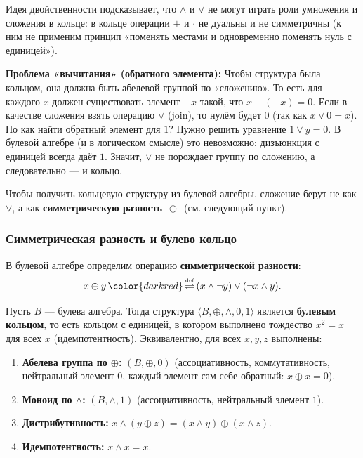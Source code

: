 \documentclass[11pt, a4paper]{extarticle}
\renewcommand{\eqdef}{\ifmmode{\,\color{darkred}\mathop{\overset{\text{\tiny def}}{\rightleftharpoons}}\,}\fi}%
\newcommand{\eqdef}{\,\mathop{\color{darkred}\overset{\text{\tiny def}}{\rightleftharpoons}}\,}
\begin{document}
\begin{remark}
Идея двойственности подсказывает, что $\wedge$ и $\vee$ не могут играть роли умножения и сложения в кольце:
в кольце операции $+$ и $\cdot$ не дуальны и не симметричны (к ним не применим принцип «поменять местами и одновременно поменять нуль с единицей»).

\medskip
\textbf{Проблема «вычитания» (обратного элемента):} Чтобы структура была кольцом, она должна быть абелевой группой по «сложению». То есть для каждого $x$ должен существовать элемент $-x$ такой, что $x + (-x) = 0$.
Если в качестве сложения взять операцию $\vee$ (join), то нулём будет $0$ (так как $x \vee 0 = x$).
Но как найти обратный элемент для $1$? Нужно решить уравнение $1 \vee y = 0$.
В булевой алгебре (и в логическом смысле) это невозможно: дизъюнкция с единицей всегда даёт $1$.
Значит, $\vee$ не порождает группу по сложению, а следовательно --- и кольцо.

Чтобы получить кольцевую структуру из булевой алгебры, сложение берут не как $\vee$, а как \textbf{симметрическую разность} $\,\oplus\,$ (см. следующий пункт).
\end{remark}

\subsubsection{Симметрическая разность и булево кольцо}

\begin{definition}
В булевой алгебре определим операцию \textbf{симметрической разности}:
$$
x \oplus y \eqdef (x \wedge \neg y) \vee (\neg x \wedge y).
$$
\end{definition}

\begin{theorem}
Пусть $B$ --- булева алгебра. Тогда структура $\langle B, \oplus, \wedge, 0, 1 \rangle$ является \textbf{булевым кольцом}, то есть кольцом с единицей, в котором выполнено тождество $x^2=x$ для всех $x$ (идемпотентность).
Эквивалентно, для всех $x,y,z$ выполнены:
\begin{enumerate}[label=(\alph*), nosep]
    \item \textbf{Абелева группа по $\oplus$:} $(B,\oplus,0)$ (ассоциативность, коммутативность, нейтральный элемент $0$, каждый элемент сам себе обратный: $x\oplus x=0$).
    \item \textbf{Моноид по $\wedge$:} $(B,\wedge,1)$ (ассоциативность, нейтральный элемент $1$). 
    \item \textbf{Дистрибутивность:} $x\wedge(y\oplus z) = (x\wedge y)\oplus(x\wedge z)$.
    \item \textbf{Идемпотентность:} $x\wedge x = x$.
\end{enumerate}
\end{theorem}
\end{document}

